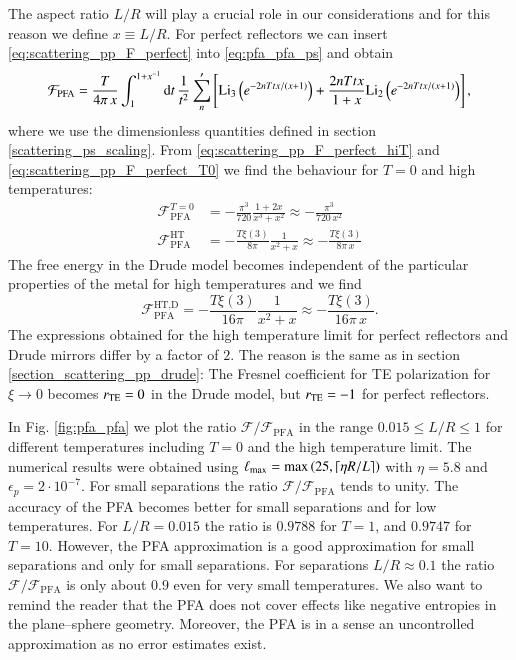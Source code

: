 The aspect ratio $L/R$ will play a crucial role in our considerations and for
this reason we define $x\equiv L/R$.
For perfect reflectors we can insert \eqref{eq:scattering_pp_F_perfect}
into \eqref{eq:pfa_pfa_ps} and obtain
\begin{equation}
\mathcal{F}_\text{PFA} = \frac{T}{4\pi \, x} \int_1^{1+x^{-1}} \mathrm{d}t \, \frac{1}{t^2} \sum_n^\prime \left[\text{Li}_3\left(e^{-2nTtx/(x+1)}\right)+ \frac{2nT t x}{1+x} \text{Li}_2\left(e^{-2nTtx/(x+1)}\right)\right],
\end{equation}
where we use the dimensionless quantities defined in section
\ref{scattering_ps_scaling}. From \eqref{eq:scattering_pp_F_perfect_hiT}
and \eqref{eq:scattering_pp_F_perfect_T0} we find the behaviour for
$T=0$ and high temperatures:
\begin{align}
\label{eq:pfa_T0}
\mathcal{F}_\text{PFA}^{T=0}     &= -\frac{\pi^3}{720} \frac{1+2x}{x^3+x^2} \approx -\frac{\pi^3}{720 \, x^2} \\
\label{eq:pfa_HT}
\mathcal{F}_\text{PFA}^\text{HT} &= -\frac{T \xi(3)}{8\pi} \frac{1}{x^2+x} \approx -\frac{T \xi(3)}{8\pi \, x}
\end{align}
The free energy in the Drude model becomes independent of the particular properties of the metal for
high temperatures and we find
\begin{equation}
\label{eq:pfa_HT_drude}
\mathcal{F}_\text{PFA}^\text{HT,D} = -\frac{T \xi(3)}{16\pi} \frac{1}{x^2+x} \approx -\frac{T \xi(3)}{16\pi \, x}.
\end{equation}
The expressions obtained for the high temperature limit for perfect reflectors
and Drude mirrors differ by a factor of $2$. The reason is the same as in
section \ref{section_scattering_pp_drude}: The Fresnel coefficient for TE
polarization for $\xi\to0$ becomes $r_{\mathrm{TE}}=0$ in the Drude model, but $r_{\mathrm{TE}}=-1$
for perfect reflectors.
    
In Fig. \ref{fig:pfa_pfa} we plot the ratio
$\mathcal{F}/\mathcal{F}_\text{PFA}$ in the range $0.015\le L/R \le 1$ for
different temperatures including $T=0$ and the high temperature limit.
The numerical results were obtained using ${\ell_\text{max}} =
\text{max}\left(25,\lceil\eta R/L\rceil\right)$ with $\eta=5.8$ and
$\epsilon_p=2\cdot10^{-7}$. For small separations the ratio
$\mathcal{F}/\mathcal{F}_\text{PFA}$ tends to unity. The accuracy of the PFA
becomes better for small separations and for low temperatures. For $L/R=0.015$
the ratio is $0.9788$ for $T=1$, and $0.9747$ for $T=10$. However, the PFA
approximation is a good approximation for small separations and only for small
separations. For separations $L/R\approx0.1$ the ratio $\mathcal{F}/\mathcal{F}_\text{PFA}$ is only about $0.9$
even for very small temperatures. We also want to remind the reader that the
PFA does not cover effects like negative entropies in the plane--sphere geometry.
Moreover, the PFA is in a sense an uncontrolled approximation as no error estimates
exist.

